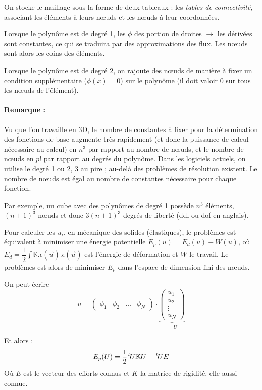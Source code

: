 \documentclass{article}
\newcommand{\transpose}{\hspace{.1em}{}^t\hspace{-.1em}}
\begin{document}
On stocke le maillage sous la forme de deux tableaux : les \emph{tables de connectivité}, associant les éléments à leurs nœuds et les nœuds à leur coordonnées.
\bigskip

Lorsque le polynôme est de degré 1, les $\phi$ des portion de droites $\to$ les dérivées sont constantes, ce qui se traduira par des approximations des flux. Les nœuds sont alors les coins des éléments.

Lorsque le polynôme est de degré 2, on rajoute des nœuds de manière à fixer un condition supplémentaire ($\phi (x) = 0$) sur le polynôme (il doit valoir 0 sur tous les nœuds de l'élément).

\paragraph{Remarque :} Vu que l'on travaille en 3D, le nombre de constantes à fixer pour la détermination des fonctions de base augmente très rapidement (et donc la puissance de calcul nécessaire au calcul) en $n^3$ par rapport au nombre de nœuds, et le nombre de nœuds en $p!$ par rapport au degrés du polynôme. Dans les logiciels actuels, on utilise le degré 1 ou 2, 3 au pire ; au-delà des problèmes de résolution existent. Le nombre de nœuds est égal au nombre de constantes nécessaire pour chaque fonction.

Par exemple, un cube avec des polynômes de degré 1 possède $n^3$ éléments, $(n+1)^3$ nœuds et donc $3(n+1)^3$ degrés de liberté (ddl ou dof en anglais).


Pour calculer les $u_i$, en mécanique des solides (élastiques), le problèmes est équivalent à minimiser une énergie potentielle $E_p(u)=E_d(u) + W(u)$, où $E_d = \dfrac{1}{2}\int \mathbb{K}.\epsilon (\vec{u}).\epsilon(\vec{u})$ est l'énergie de déformation et $W$ le travail. Le problèmes est alors de minimiser $E_p$ dans l'espace de dimension fini des nœuds.

On peut écrire 
\[u=\begin{pmatrix}
\phi_1 & \phi_2 & \hdots & \phi_N
\end{pmatrix}
\cdot
\underbrace{
\begin{pmatrix}
u_1\\
u_2\\
\vdots\\
u_N
\end{pmatrix}}_{= U}
\]

Et alors :
\[E_p(U)=\dfrac{1}{2}\transpose U \mathbb{K} U - \transpose U E\]
Où $E$ est le vecteur des efforts connus et $K$ la matrice de rigidité, elle aussi connue.
\end{document}
